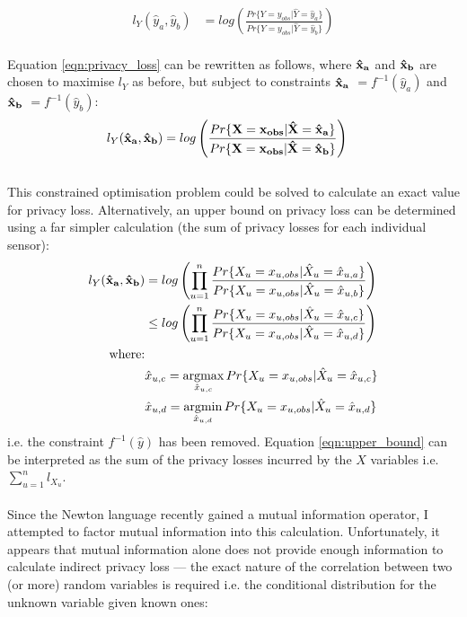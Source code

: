 \documentclass[12pt]{article}
\DeclareMathOperator*{\argmax}{argmax}
\DeclareMathOperator*{\argmin}{argmin}
\begin{document}
\begin{appendix}
\begin{align}
      l_Y(\hat{y}_a, \hat{y}_b) & = log \left( \frac{Pr\{ Y = y_{obs} | \hat{Y} = \hat{y}_a \}}{Pr\{ Y = y_{obs} | \hat{Y} = \hat{y}_b \}} \right) \label{eqn:privacy_loss}
    \end{align}
    \\
    Equation \ref{eqn:privacy_loss} can be rewritten as follows, where $\bf{\hat{x}_a}$ and $\bf{\hat{x}_b}$ are chosen to maximise $l_Y$ as before, but subject to constraints $\bf{\hat{x}_a}$ $ = f^{-1}(\hat{y}_a)$ and $\bf{\hat{x}_b}$ $ = f^{-1}(\hat{y}_b)$:
    \begin{align}
      l_Y(\bf{\hat{x}_a}, \bf{\hat{x}_b}) & = log \left( \frac{Pr\{ \bf{X} = \bf{x}_{obs} | \bf{\hat{X}} = \bf{\hat{x}_a} \}}{Pr\{ \bf{X} = \bf{x}_{obs} | \bf{\hat{X}} = \bf{\hat{x}_b} \}} \right)
    \end{align}
    \\
    This constrained optimisation problem could be solved to calculate an exact value for privacy loss. Alternatively, an upper bound on privacy loss can be determined using a far simpler calculation (the sum of privacy losses for each individual sensor):
    \begin{align}
      l_Y(\bf{\hat{x}_a}, \bf{\hat{x}_b}) & = log \left( \prod_{u=1}^n \frac{Pr\{ X_u = x_{u,obs} | \hat{X}_u = \hat{x}_{u,a} \}} {Pr\{ X_u = x_{u,obs} | \hat{X}_u = \hat{x}_{u,b} \}} \right) \nonumber \\
      & \leq log \left( \prod_{u=1}^n \frac{Pr\{ X_u = x_{u,obs} | \hat{X}_u = \hat{x}_{u,c} \}}{Pr\{ X_u = x_{u,obs} | \hat{X}_u = \hat{x}_{u,d} \}} \right) \label{eqn:upper_bound} \\
      \text{where:} & \nonumber \\
      & \hat{x}_{u,c} = \argmax_{\hat{x}_{u,c}}Pr\{ X_u = x_{u,obs} | \hat{X}_u = \hat{x}_{u,c} \} \nonumber \\
      & \hat{x}_{u,d} = \argmin_{\hat{x}_{u,d}}Pr\{ X_u = x_{u,obs} | \hat{X}_u = \hat{x}_{u,d} \} \nonumber
    \end{align}
    i.e. the constraint $f^{-1}(\hat{y})$ has been removed. Equation \ref{eqn:upper_bound} can be interpreted as the sum of the privacy losses incurred by the $X$ variables i.e. $\sum_{u=1}^n l_{X_u}$.
    \\
    \\
    Since the Newton language recently gained a mutual information operator, I attempted to factor mutual information into this calculation. Unfortunately, it appears that mutual information alone does not provide enough information to calculate indirect privacy loss --- the exact nature of the correlation between two (or more) random variables is required i.e. the conditional distribution for the unknown variable given known ones:

\end{appendix}
\end{document}
